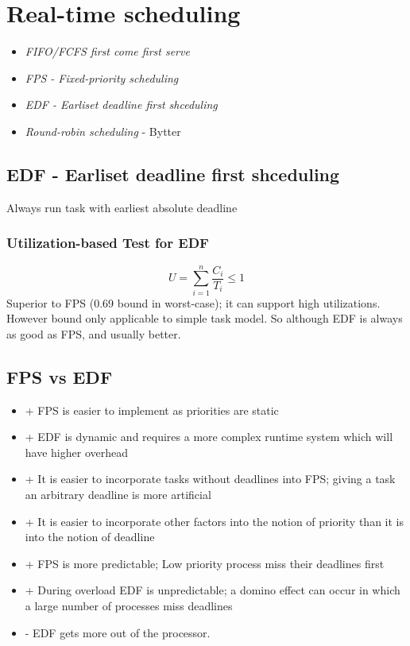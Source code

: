 \section{Real-time scheduling}
\begin{itemize}
\item 
\emph{FIFO/FCFS first come first serve}
\item 
\emph{FPS - Fixed-priority scheduling} 
\item 
\emph{EDF - Earliset deadline first shceduling}
\item 
\emph{Round-robin scheduling } - Bytter 
\end{itemize}

\subsection{EDF - Earliset deadline first shceduling}

Always run task with earliest absolute deadline

\subsubsection{Utilization-based Test for EDF}
$$ U = \sum\limits_{i=1}^n \frac{C_i}{T_i} \leq 1 $$
Superior to FPS (0.69 bound in worst-case); it can
support high utilizations. However bound only applicable to simple task model. So although EDF is always as good as FPS, and usually better.

\subsection{FPS vs EDF}
\begin{itemize}
\item + FPS is easier to implement as priorities are static
\item + EDF is dynamic and requires a more complex runtime
system which will have higher overhead
\item + It is easier to incorporate tasks without deadlines
into FPS; giving a task an arbitrary deadline is more
artificial
\item + It is easier to incorporate other factors into the
notion of priority than it is into the notion of deadline
\item + FPS is more predictable; Low priority process miss
their deadlines first
\item + During overload EDF is unpredictable; a domino effect can occur in
which a large number of processes miss deadlines
\item - EDF gets more out of the processor.
\end{itemize}